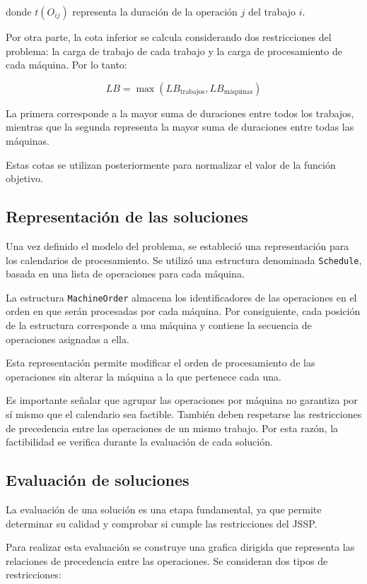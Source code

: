 \documentclass[12pt,a4paper]{article}
\begin{document}
donde $t(O_{ij})$ representa la duración de la operación $j$ del trabajo $i$.

Por otra parte, la cota inferior se calcula considerando dos restricciones del problema: la carga de trabajo de cada trabajo y la carga de procesamiento de cada máquina. Por lo tanto:

\[
LB = \max(LB_{\text{trabajos}},
          LB_{\text{máquinas}})
\]

La primera corresponde a la mayor suma de duraciones entre todos los trabajos, mientras que la segunda representa la mayor suma de duraciones entre todas las máquinas.

Estas cotas se utilizan posteriormente para normalizar el valor de la función objetivo.

\subsection{Representación de las soluciones}

Una vez definido el modelo del problema, se estableció una representación para los calendarios de procesamiento. Se utilizó una estructura denominada \texttt{Schedule}, basada en una lista de operaciones para cada máquina.

La estructura \texttt{MachineOrder} almacena los identificadores de las operaciones en el orden en que serán procesadas por cada máquina. Por consiguiente, cada posición de la estructura corresponde a una máquina y contiene la secuencia de operaciones asignadas a ella.

Esta representación permite modificar el orden de procesamiento de las operaciones sin alterar la máquina a la que pertenece cada una.

Es importante señalar que agrupar las operaciones por máquina no garantiza por sí mismo que el calendario sea factible. También deben respetarse las restricciones de precedencia entre las operaciones de un mismo trabajo. Por esta razón, la factibilidad se verifica durante la evaluación de cada solución.

\subsection{Evaluación de soluciones}

La evaluación de una solución es una etapa fundamental, ya que permite determinar su calidad y comprobar si cumple las restricciones del JSSP.

Para realizar esta evaluación se construye una grafica dirigida que representa las relaciones de precedencia entre las operaciones. Se consideran dos tipos de restricciones:
\end{document}
